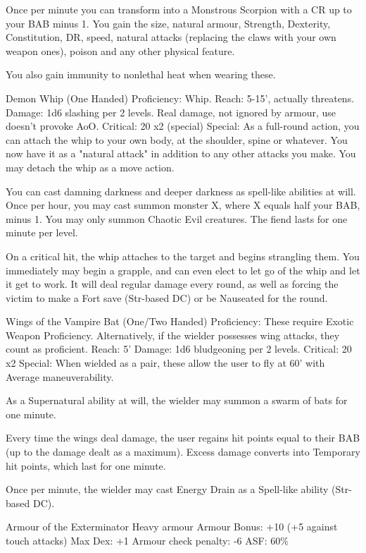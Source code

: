 Once per minute you can transform into a Monstrous Scorpion with a CR up to your BAB minus 1. You gain the size, natural armour, Strength, Dexterity, Constitution, DR, speed, natural attacks (replacing the claws with your own weapon ones), poison and any other physical feature.

You also gain immunity to nonlethal heat when wearing these.


Demon Whip (One Handed)
Proficiency: Whip.
Reach: 5-15', actually threatens.
Damage: 1d6 slashing per 2 levels. Real damage, not ignored by armour, use doesn't provoke AoO.
Critical: 20 x2 (special)
Special:
As a full-round action, you can attach the whip to your own body, at the shoulder, spine or whatever. You now have it as a "natural attack" in addition to any other attacks you make. You may detach the whip as a move action.

You can cast damning darkness and deeper darkness as spell-like abilities at will. Once per hour, you may cast summon monster X, where X equals half your BAB, minus 1. You may only summon Chaotic Evil creatures. The fiend lasts for one minute per level.

On a critical hit, the whip attaches to the target and begins strangling them. You immediately may begin a grapple, and can even elect to let go of the whip and let it get to work. It will deal regular damage every round, as well as forcing the victim to make a Fort save (Str-based DC) or be Nauseated for the round.


Wings of the Vampire Bat (One/Two Handed)
Proficiency: These require Exotic Weapon Proficiency. Alternatively, if the wielder possesses wing attacks, they count as proficient.
Reach: 5'
Damage: 1d6 bludgeoning per 2 levels.
Critical: 20 x2
Special:
When wielded as a pair, these allow the user to fly at 60' with Average maneuverability.

As a Supernatural ability at will, the wielder may summon a swarm of bats for one minute.

Every time the wings deal damage, the user regains hit points equal to their BAB (up to the damage dealt as a maximum). Excess damage converts into Temporary hit points, which last for one minute.

Once per minute, the wielder may cast Energy Drain as a Spell-like ability (Str-based DC).


Armour of the Exterminator
Heavy armour
Armour Bonus: +10 (+5 against touch attacks)
Max Dex: +1
Armour check penalty: -6
ASF: 60\%

